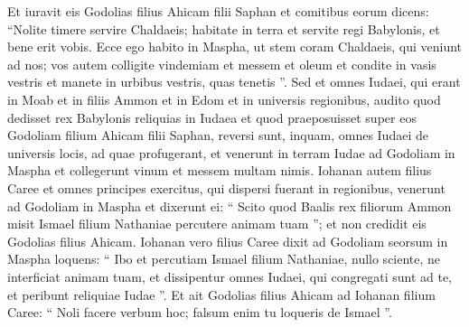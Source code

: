 \begin{biblechapter}
\begin{biblechapter}
\begin{biblechapter}
\begin{biblechapter}
\begin{biblechapter}
\begin{biblechapter}
\begin{biblechapter}
\begin{biblechapter}
\begin{biblechapter}
\begin{biblechapter}
\begin{biblechapter}
\begin{biblechapter}
\begin{biblechapter}
\begin{biblechapter}
\begin{biblechapter}
\begin{biblechapter}
\begin{biblechapter}
\begin{biblechapter}
\begin{biblechapter}
\begin{biblechapter}
\begin{biblechapter}
\begin{biblechapter}
\begin{biblechapter}
\begin{biblechapter}
\begin{biblechapter}
\begin{biblechapter}
\begin{biblechapter}
\begin{biblechapter}
\begin{biblechapter}
\begin{biblechapter}
\begin{biblechapter}
\begin{biblechapter}
\begin{biblechapter}
\begin{biblechapter}
\begin{biblechapter}
\begin{biblechapter}
\begin{biblechapter}
\begin{biblechapter}
\begin{biblechapter}
\begin{biblechapter}
\verse Et iuravit eis Godolias filius Ahicam filii Saphan et comitibus eorum dicens: “Nolite timere servire Chaldaeis; habitate in terra et servite regi Babylonis, et bene erit vobis. 
\verse Ecce ego habito in Maspha, ut stem coram Chaldaeis, qui veniunt ad nos; vos autem colligite vindemiam et messem et oleum et condite in vasis vestris et manete in urbibus vestris, quas tenetis ”.
 \verse Sed et omnes Iudaei, qui erant in Moab et in filiis Ammon et in Edom et in universis regionibus, audito quod dedisset rex Babylonis reliquias in Iudaea et quod praeposuisset super eos Godoliam filium Ahicam filii Saphan, 
\verse reversi sunt, inquam, omnes Iudaei de universis locis, ad quae profugerant, et venerunt in terram Iudae ad Godoliam in Maspha et collegerunt vinum et messem multam nimis.
 \verse Iohanan autem filius Caree et omnes principes exercitus, qui dispersi fuerant in regionibus, venerunt ad Godoliam in Maspha 
\verse et dixerunt ei: “ Scito quod Baalis rex filiorum Ammon misit Ismael filium Nathaniae percutere animam tuam ”; et non credidit eis Godolias filius Ahicam. 
\verse Iohanan vero filius Caree dixit ad Godoliam seorsum in Maspha loquens: “ Ibo et percutiam Ismael filium Nathaniae, nullo sciente, ne interficiat animam tuam, et dissipentur omnes Iudaei, qui congregati sunt ad te, et peribunt reliquiae Iudae ”. 
\verse Et ait Godolias filius Ahicam ad Iohanan filium Caree: “ Noli facere verbum hoc; falsum enim tu loqueris de Ismael ”.
 

\end{biblechapter}
\end{biblechapter}
\end{biblechapter}
\end{biblechapter}
\end{biblechapter}
\end{biblechapter}
\end{biblechapter}
\end{biblechapter}
\end{biblechapter}
\end{biblechapter}
\end{biblechapter}
\end{biblechapter}
\end{biblechapter}
\end{biblechapter}
\end{biblechapter}
\end{biblechapter}
\end{biblechapter}
\end{biblechapter}
\end{biblechapter}
\end{biblechapter}
\end{biblechapter}
\end{biblechapter}
\end{biblechapter}
\end{biblechapter}
\end{biblechapter}
\end{biblechapter}
\end{biblechapter}
\end{biblechapter}
\end{biblechapter}
\end{biblechapter}
\end{biblechapter}
\end{biblechapter}
\end{biblechapter}
\end{biblechapter}
\end{biblechapter}
\end{biblechapter}
\end{biblechapter}
\end{biblechapter}
\end{biblechapter}
\end{biblechapter}
